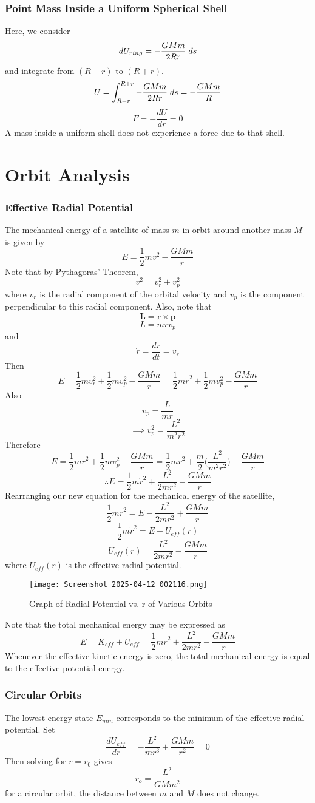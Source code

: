 \documentclass{article}
\begin{document}
\subsubsection{Point Mass Inside a Uniform Spherical Shell}
Here, we consider 
$$dU_{ring}=-\frac{GMm}{2Rr}\hspace{0.1cm}ds$$
and integrate from $(R-r)$ to $(R+r)$.
$$U=\int_{R-r}^{R+r}-\frac{GMm}{2Rr}\hspace{0.1cm}ds=-\frac{GMm}{R}$$ 
$$F=-\frac{dU}{dr}=0$$
A mass inside a uniform shell does not experience a force due to that shell.
\newpage
\section{Orbit Analysis}
\subsubsection{Effective Radial Potential}
The mechanical energy of a satellite of mass $m$ in orbit around another mass $M$ is given by
$$E=\frac{1}{2}mv^2-\frac{GMm}{r}$$
Note that by Pythagoras' Theorem,
$$v^2=v_r^2+v_p^2$$
where $v_r$ is the radial component of the orbital velocity and $v_p$ is the component perpendicular to this radial component. Also, note that
$$\bm{L}=\bm{r}\times\bm{p}$$
$$L=mrv_p$$
and 
$$\dot r=\frac{dr}{dt}=v_r$$
Then
$$E=\frac{1}{2}mv_r^2+\frac{1}{2}mv_p^2-\frac{GMm}{r}=\frac{1}{2}m\dot r^2+\frac{1}{2}mv_p^2-\frac{GMm}{r}$$
Also
$$v_p=\frac{L}{mr}$$
$$\implies v_p^2=\frac{L^2}{m^2r^2}$$
Therefore
$$E=\frac{1}{2}m\dot r^2+\frac{1}{2}mv_p^2-\frac{GMm}{r}=\frac{1}{2}m\dot r^2+\frac{m}{2}\Bigg(\frac{L^2}{m^2r^2}\Bigg)-\frac{GMm}{r}$$
$$\therefore E=\frac{1}{2}m\dot r^2+\frac{L^2}{2mr^2}-\frac{GMm}{r}$$
Rearranging our new equation for the mechanical energy of the satellite,
$$\frac{1}{2}m\dot r^2=E-\frac{L^2}{2mr^2}+\frac{GMm}{r}$$
$$\frac{1}{2}m\dot r^2=E-U_{eff}(r)$$
$$U_{eff}(r)=\frac{L^2}{2mr^2}-\frac{GMm}{r}$$ 
where $U_{eff}(r)$ is the effective radial potential.
\newpage
\begin{figure}
    \centering
    \texttt{[image: Screenshot 2025-04-12 002116.png]}
    \caption{Graph of Radial Potential vs. r  of Various Orbits}
    \label{fig:5}
\end{figure}
Note that the total mechanical energy may be expressed as
$$E=K_{eff}+U_{eff}=\frac{1}{2}m\dot r^2+\frac{L^2}{2mr^2}-\frac{GMm}{r}$$
Whenever the effective kinetic energy is zero, the total mechanical energy is equal to the effective potential energy.
\subsubsection{Circular Orbits}
The lowest energy state $E_{min}$ corresponds to the minimum of the effective radial potential. Set
$$\frac{dU_{eff}}{dr}=-\frac{L^2}{mr^3}+\frac{GMm}{r^2}=0$$
Then solving for $r=r_0$ gives
$$r_o=\frac{L^2}{GMm^2}$$
for a circular orbit, the distance between $m$ and $M$ does not change.
\end{document}
